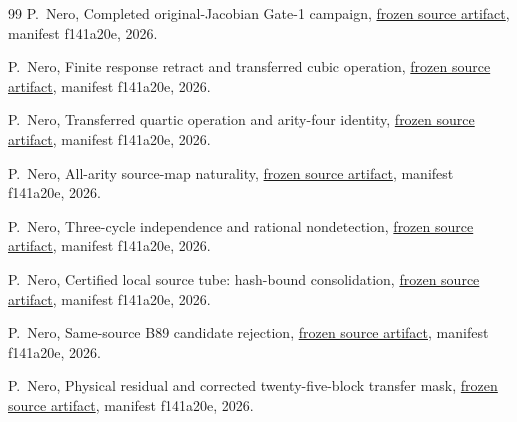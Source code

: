 \documentclass[11pt]{article}
\begin{document}
\begin{thebibliography}{99}
P.~Nero,
\newblock Completed original-Jacobian Gate-1 campaign,
\newblock \href{https://github.com/PeterNero/mtt-results-repro/blob/f141a20ea23c5c3ff19cc2161c0e226e29ade8a7/release/results/eta9_gate1_campaign/artifact.json}{frozen source artifact}, manifest f141a20e, 2026.

P.~Nero,
\newblock Finite response retract and transferred cubic operation,
\newblock \href{https://github.com/PeterNero/mtt-results-repro/blob/f141a20ea23c5c3ff19cc2161c0e226e29ade8a7/release/results/causal_base_q79_symmetric_response_retraction_transferred_m3_packet/artifact.json}{frozen source artifact}, manifest f141a20e, 2026.

P.~Nero,
\newblock Transferred quartic operation and arity-four identity,
\newblock \href{https://github.com/PeterNero/mtt-results-repro/blob/f141a20ea23c5c3ff19cc2161c0e226e29ade8a7/release/results/causal_base_q79_symmetric_response_transferred_m4_packet/artifact.json}{frozen source artifact}, manifest f141a20e, 2026.

P.~Nero,
\newblock All-arity source-map naturality,
\newblock \href{https://github.com/PeterNero/mtt-results-repro/blob/f141a20ea23c5c3ff19cc2161c0e226e29ade8a7/release/results/causal_base_q79_all_arity_source_promotion_packet/artifact.json}{frozen source artifact}, manifest f141a20e, 2026.

P.~Nero,
\newblock Three-cycle independence and rational nondetection,
\newblock \href{https://github.com/PeterNero/mtt-results-repro/blob/f141a20ea23c5c3ff19cc2161c0e226e29ade8a7/release/results/eta9_three_cycle_b96_nondetection/artifact.json}{frozen source artifact}, manifest f141a20e, 2026.

P.~Nero,
\newblock Certified local source tube: hash-bound consolidation,
\newblock \href{https://github.com/PeterNero/mtt-results-repro/blob/f141a20ea23c5c3ff19cc2161c0e226e29ade8a7/release/results/q79_eta9_local_source_tube_consolidation/artifact.json}{frozen source artifact}, manifest f141a20e, 2026.

P.~Nero,
\newblock Same-source B89 candidate rejection,
\newblock \href{https://github.com/PeterNero/mtt-results-repro/blob/f141a20ea23c5c3ff19cc2161c0e226e29ade8a7/release/results/q79_eta9_b89_same_source_rejection/artifact.json}{frozen source artifact}, manifest f141a20e, 2026.

P.~Nero,
\newblock Physical residual and corrected twenty-five-block transfer mask,
\newblock \href{https://github.com/PeterNero/mtt-results-repro/blob/f141a20ea23c5c3ff19cc2161c0e226e29ade8a7/release/results/unified_source_physical_residual_transfer/artifact.json}{frozen source artifact}, manifest f141a20e, 2026.

\end{thebibliography}
\end{document}
